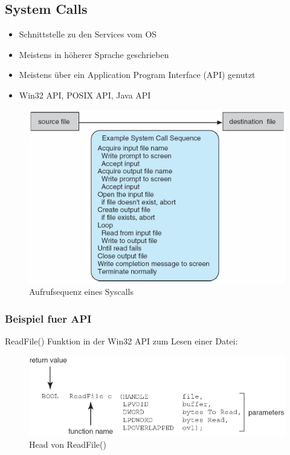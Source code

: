 \documentclass[a4paper]{scrreprt}
\begin{document}
\subsection{System Calls}
\begin{itemize}
	\item Schnittstelle zu den Services vom OS
	\item Meistens in höherer Sprache geschrieben
	\item Meistens über ein Application Program Interface (API) genutzt
	\item Win32 API, POSIX API, Java API
\end{itemize}

\begin{figure}[ht]
\centering
\includegraphics[scale=0.3]{graphics/system_call.png}
\caption{Aufrufsequenz eines Syscalls}
\end{figure}

\subsubsection{Beispiel fuer API}

ReadFile() Funktion in der Win32 API zum Lesen einer Datei:\\

\begin{figure}[ht]
\centering
\includegraphics[scale=0.4]{graphics/api.png}
\caption{Head von ReadFile()}
\end{figure}
\end{document}
